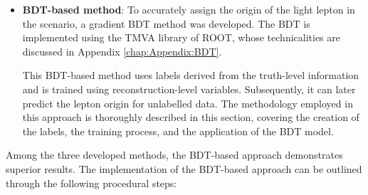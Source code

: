 \begin{itemize}
	
	\item \textbf{BDT-based method}: To accurately assign the origin of the light lepton 
	in the \dilepSStau scenario, a gradient BDT method was developed. The BDT is 
	implemented using the TMVA library of ROOT, whose technicalities are discussed 
	in Appendix \ref{chap:Appendix:BDT}.
	
	This BDT-based method uses labels derived from the truth-level information and is 
	trained using reconstruction-level variables. Subsequently, it can later predict the 
	lepton origin for unlabelled data.  The methodology employed in this approach is
	 thoroughly described in this section, covering the creation of the labels, the training 
	 process, and the application of the BDT model.

\end{itemize}

Among the three developed methods, the BDT-based approach demonstrates 
superior results. The implementation of the BDT-based approach can be outlined 
through the following procedural steps:

